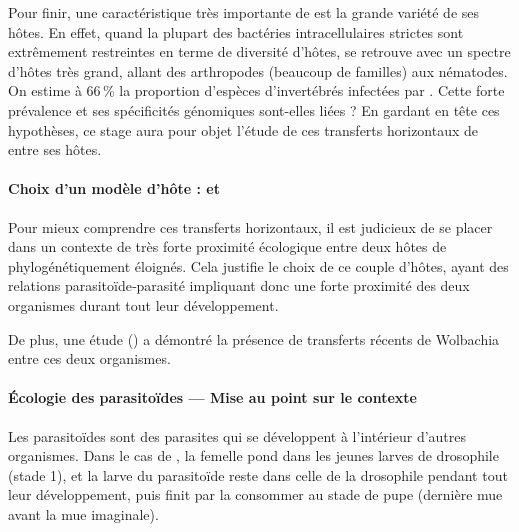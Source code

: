 Pour finir, une caractéristique très importante de  est la grande variété de ses hôtes. En effet, quand la plupart des bactéries intracellulaires strictes sont extrêmement restreintes en terme de diversité d'hôtes,  se retrouve avec un spectre d'hôtes très grand, allant des arthropodes (beaucoup de familles) aux nématodes. On estime à 66\,\% la proportion d'espèces d'invertébrés infectées par \cite{hilgenboecker2008}.
Cette forte prévalence et ses spécificités génomiques sont-elles liées ?
En gardant en tête ces hypothèses, ce stage aura pour objet l’étude de ces transferts horizontaux de  entre ses hôtes.

\paragraph{Choix d’un modèle d’hôte :  et \\}
Pour mieux comprendre ces transferts horizontaux, il est judicieux de se placer dans un contexte de très forte proximité écologique entre deux hôtes de  phylogénétiquement éloignés. Cela justifie le choix de ce couple d’hôtes, ayant des relations parasitoïde‐parasité impliquant donc une forte proximité des deux organismes durant tout leur développement.

De plus, une étude (\cite{vavre1999}) a démontré la présence de transferts récents de Wolbachia entre ces deux organismes.

\begin{encart} %
	\paragraph{Écologie des parasitoïdes --- Mise au point sur le contexte} %
	\label{par:parasitoïdes}
	Les parasitoïdes sont des parasites qui se développent à l’intérieur d’autres organismes. Dans le cas de , la femelle pond dans les jeunes larves de drosophile (stade 1), et la larve du parasitoïde reste dans celle de la drosophile pendant tout leur développement, puis finit par la consommer au stade de pupe (dernière mue avant la mue imaginale).
\end{encart}

